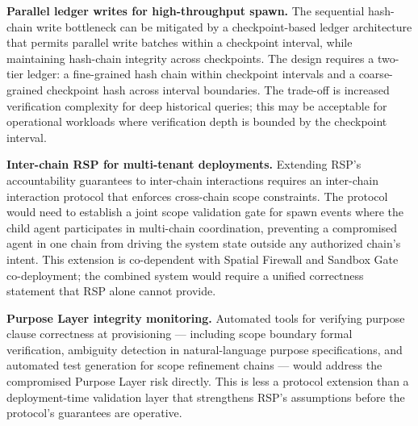 \medskip
\noindent\textbf{Parallel ledger writes for high-throughput spawn.} The sequential hash-chain write bottleneck can be mitigated by a checkpoint-based ledger architecture that permits parallel write batches within a checkpoint interval, while maintaining hash-chain integrity across checkpoints. The design requires a two-tier ledger: a fine-grained hash chain within checkpoint intervals and a coarse-grained checkpoint hash across interval boundaries. The trade-off is increased verification complexity for deep historical queries; this may be acceptable for operational workloads where verification depth is bounded by the checkpoint interval.

\medskip
\noindent\textbf{Inter-chain RSP for multi-tenant deployments.} Extending RSP's accountability guarantees to inter-chain interactions requires an inter-chain interaction protocol that enforces cross-chain scope constraints. The protocol would need to establish a joint scope validation gate for spawn events where the child agent participates in multi-chain coordination, preventing a compromised agent in one chain from driving the system state outside any authorized chain's intent. This extension is co-dependent with Spatial Firewall and Sandbox Gate co-deployment; the combined system would require a unified correctness statement that RSP alone cannot provide.

\medskip
\noindent\textbf{Purpose Layer integrity monitoring.} Automated tools for verifying purpose clause correctness at provisioning — including scope boundary formal verification, ambiguity detection in natural-language purpose specifications, and automated test generation for scope refinement chains — would address the compromised Purpose Layer risk directly. This is less a protocol extension than a deployment-time validation layer that strengthens RSP's assumptions before the protocol's guarantees are operative.